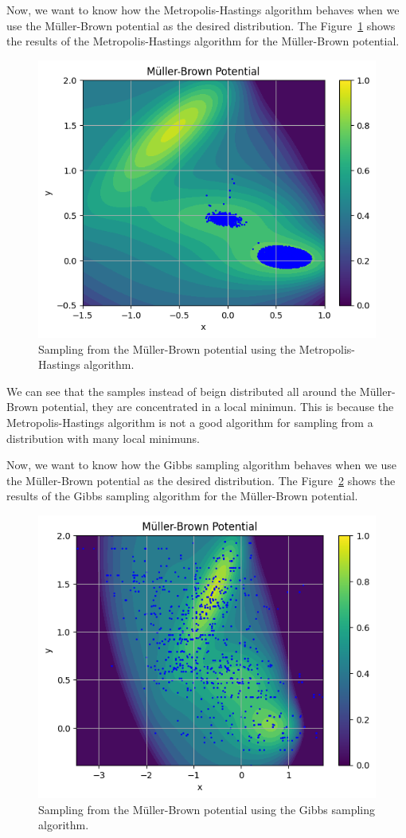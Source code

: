 \documentclass{article}
\begin{document}

Now, we want to know how the Metropolis-Hastings algorithm behaves when we use the Müller-Brown potential as the desired distribution. The Figure~\ref{fig:mullerbrownmh} shows the results of the Metropolis-Hastings algorithm for the Müller-Brown potential.

\begin{figure}[H]
	\centering
	\includegraphics[width=0.5\linewidth]{./Figures/MCMC/mullerbrownmh.png}
	\caption{Sampling from the Müller-Brown potential using the Metropolis-Hastings algorithm.}
	\label{fig:mullerbrownmh}
\end{figure}

We can see that the samples instead of beign distributed all around the Müller-Brown potential, they are concentrated in a local minimun. This is because the Metropolis-Hastings algorithm is not a good algorithm for sampling from a distribution with many local minimuns.


Now, we want to know how the Gibbs sampling algorithm behaves when we use the Müller-Brown potential as the desired distribution. The Figure~\ref{fig:mullerbrowngibbs} shows the results of the Gibbs sampling algorithm for the Müller-Brown potential.

\begin{figure}[H]
	\centering
	\includegraphics[width=0.5\linewidth]{./Figures/MCMC/mullerbrowngibbs.png}
	\caption{Sampling from the Müller-Brown potential using the Gibbs sampling algorithm.}
	\label{fig:mullerbrowngibbs}
\end{figure}
\end{document}
